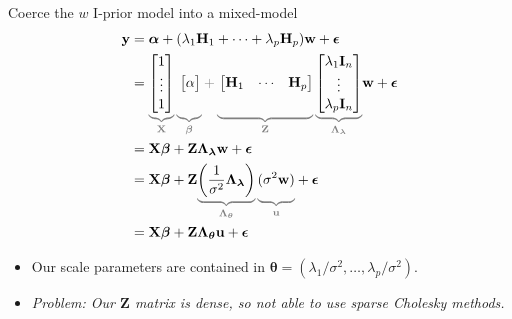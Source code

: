 \documentclass[]{beamer}\usepackage[]{graphicx}\usepackage[]{color}
\begin{document}
\begin{frame}{Coerce the $w$ I-prior model into a mixed-model}
	\vspace{-5mm}
	\begin{align*}
	\mathbf y &= \boldsymbol{\alpha} + (\lambda_1\mathbf H_1 + \dots + \lambda_p\mathbf H_p) \mathbf w + \boldsymbol{\epsilon} \\
	&=
	{\color{gray}
	\underbrace{ \color{black}
	\begin{bmatrix}
		1 \\
		\vdots \\
		1
	\end{bmatrix}
	}_{\mathbf X}
	\underbrace{\color{black} \vphantom{\begin{bmatrix} 1 \\ \vdots \\ 1 \end{bmatrix}}
	\begin{bmatrix}
		\alpha
	\end{bmatrix}
	}_{\boldsymbol{\beta}}
	+
	\underbrace{\color{black} \vphantom{\begin{bmatrix} 1 \\ \vdots \\ 1 \end{bmatrix}}
	\begin{bmatrix}
		\mathbf H_1	&\cdots	&\mathbf H_p
	\end{bmatrix}
	}_{\mathbf Z}
	\underbrace{\color{black}
	\begin{bmatrix}
		\lambda_1\mathbf I_n \\
		\vdots \\
		\lambda_p\mathbf I_n
	\end{bmatrix}
	}_{\boldsymbol{\Lambda}_{\boldsymbol{\lambda}}}
	}
	\mathbf w + \boldsymbol{\epsilon} \\
	&= \mathbf X \boldsymbol{\beta} + \mathbf Z \boldsymbol{\Lambda}_{\boldsymbol{\lambda}} \mathbf w + \boldsymbol{\epsilon} \\
	&= \mathbf X \boldsymbol{\beta} + \mathbf Z
		{\color{gray}
		\underbrace{\color{black} \left(\frac{1}{\sigma^2}\boldsymbol{\Lambda}_{\boldsymbol{\lambda}}\right)}_{\boldsymbol{\Lambda}_{\boldsymbol{\theta}}}
		\underbrace{\color{black} \vphantom{\left(\frac{1}{\sigma^2}\boldsymbol{\Lambda}_{\boldsymbol{\lambda}}\right)}
		(\sigma^2 \mathbf w)}_{\mathbf u}
		} + \boldsymbol{\epsilon} \\
	&=  \mathbf X \boldsymbol{\beta} + \mathbf Z \boldsymbol{\Lambda}_{\boldsymbol{\theta}} \mathbf u + \boldsymbol{\epsilon}
	\end{align*}

	\begin{itemize}
		\item Our scale parameters are contained in $\boldsymbol{\theta}=(\lambda_1/\sigma^2, \dots, \lambda_p/\sigma^2)$.
		\item \textit{Problem: Our $\mathbf Z$ matrix is dense, so not able to use sparse Cholesky methods.}
	\end{itemize}
\end{frame}
\end{document}
